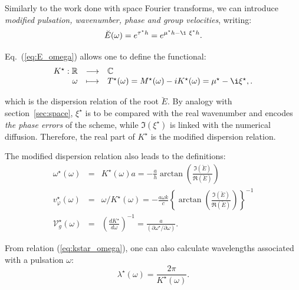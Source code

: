 \noindent Similarly to the work done with space Fourier transforms, we can introduce \emph{modified pulsation, wavenumber, phase and group velocities}, writing:
\begin{equation}
\label{eq:E_omega}
\breve{E}(\omega) = e^{\tau^{\star} h} = e^{\mu^{\star}h -\i \ \xi^{\star} h}.
\end{equation}

\noindent Eq.~(\ref{eq:E_omega}) allows one to define the functional:
$$ \begin{array}{rcl}
   K^{\star}:\mathbb{R} &\longrightarrow& \mathbb{C} \\
   \omega &\longmapsto& T^{\star}(\omega) = M^{\star}(\omega) - i K^{\star}(\omega) = \mu^{\star}- \i \xi^{\star}, .    
   \end{array}
$$

\noindent which is the dispersion relation of the root $\breve{E}$. By analogy with section~\ref{sec:space}, $\xi^\star$ is to be compared with the real wavenumber and encodes \emph{the phase errors} of the scheme, while $\Im \left(\xi^\star \right)$ is linked with the numerical diffusion. Therefore, the real part of $K^{\star}$ is the modified dispersion relation.

\noindent The modified dispersion relation also leads to the definitions:
\begin{eqnarray}
\label{eq:kstar_omega}
\omega^{\star} (\omega) &=& K^{\star}(\omega) a = - \frac{a}{h} \arctan\left(\frac{\Im (\breve{E})}{\Re (\breve{E})}\right) \\
\label{eq:vphi_omega}
v_{\varphi}^{\star}(\omega) &=& \omega / K^{\star}(\omega) = - \frac{a \omega k}{c} \left\{\arctan\left(\frac{\Im (\breve{E})}{\Re (\breve{E})}\right)\right\}^{-1} \\
\label{eq:vg_omega}
\mathcal{V}^{\star}_{g}(\omega) &=& \left(\frac{dK^\star}{d\omega}\right)^{-1} = \frac{a}{(\partial \omega^{\star} / \partial \omega)}.
\end{eqnarray}

\noindent From relation (\ref{eq:kstar_omega}), one can also calculate wavelengths associated with a pulsation $\omega$:
$$\lambda^{\star}(\omega) = \frac{2 \pi}{K^{\star}(\omega)} .$$

\vskip8mm

